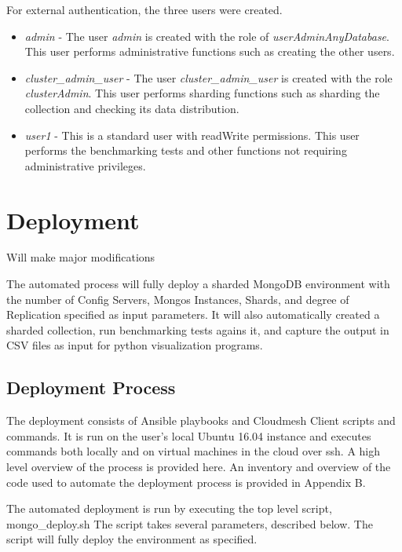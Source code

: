 \documentclass[9pt,twocolumn,twoside]{styles/osajnl}
\begin{document}
For external authentication, the three users were created.

\vspace{-\topsep}
\begin{itemize}
\item \emph{admin} - The user \emph{admin} is created with the role of \emph{userAdminAnyDatabase}.  This user performs administrative functions such as creating the other users.
\item \emph{cluster\_admin\_user} - The user \emph{cluster\_admin\_user} is created with the role \emph{clusterAdmin}. This user performs sharding functions such as sharding the collection and checking its data distribution.
\item \emph{user1} - This is a standard user with readWrite permissions.  This user performs the benchmarking tests and other functions not requiring administrative privileges.
\end{itemize}
\vspace{-\topsep}


\section{Deployment}

Will make major modifications

The automated process will fully deploy a sharded MongoDB environment with the number of Config Servers, Mongos Instances, Shards, and degree of Replication specified as input parameters.  It will also automatically created a sharded collection, run benchmarking tests agains it, and capture the output in CSV files as input for python visualization programs.

\subsection{Deployment Process}

The deployment consists of Ansible playbooks and Cloudmesh Client scripts and commands.  It is run on the user's local Ubuntu 16.04 instance and executes commands both locally and on virtual machines in the cloud over ssh.  A high level overview of the process is provided here.  An inventory and overview of the code used to automate the deployment process is provided in Appendix B.

The automated deployment is run by executing the top level script, mongo\_deploy.sh \cite{www-mongoDeploy} \cite{www-shardLocal} The script takes several parameters, described below.  The script will fully deploy the environment as specified.
\end{document}
